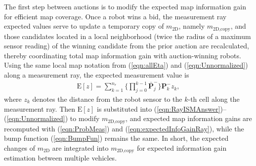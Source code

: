 \documentclass[smallextended]{svjour3}       %
\newcommand{\refeqn}[1]{(\ref{eqn:#1})}
\begin{document}
The first step between auctions is to modify the expected map information gain for efficient map coverage.  Once a robot wins a bid, the measurement ray expected values serve to update a temporary copy of $m_\text{2D}$, namely $m_\text{2D,copy}$, and those candidates located in a local neighborhood (twice the radius of a maximum sensor reading) of the winning candidate from the prior auction are recalculated, thereby coordinating total map information gain with auction-winning robots. Using the same local map notation from \refeqn{allEta} and \refeqn{Unnormalized} along a measurement ray, the expected measurement value is
\begin{align}
\label{eqn:ExpectedMeasRay}
\text{E}[z]=\sum_{k=1}^{n_{r}}\bigg\{\prod_{j=0}^{k-1}\bar{\mathbf{P}}_j^-\bigg\}\mathbf{P}_k^-z_k,
\end{align}
where $z_k$ denotes the distance from the robot sensor to the $k$-th cell along the measurement ray. Then $\text{E}[z]$ is substituted into \refeqn{RayISMAnswer}--\refeqn{Unnormalized} to modify $m_\text{2D,copy}$, and expected map information gains are recomputed with \refeqn{ProbMeas} and \refeqn{expectedInfoGainRay}, while the bump function \refeqn{BumpFun} remains the same. In short, the expected changes of $m_\text{2D}$ are integrated into $m_\text{2D,copy}$ for expected information gain estimation between multiple vehicles.
\end{document}
